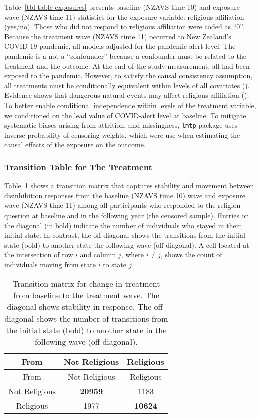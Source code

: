 \documentclass[
  singlecolumn]{article}
\begin{document}
Table~\ref{tbl-table-exposures} presents baseline (NZAVS time 10) and
exposure wave (NZAVS time 11) statistics for the exposure variable:
religious affiliation (yes/no). Those who did not respond to religious
affiliation were coded as ``0''. Because the treatment wave (NZAVS time
11) occurred to New Zealand's COVID-19 pandemic, all models adjusted for
the pandemic alert-level. The pandemic is a not a ``confounder'' because
a confounder must be related to the treatment and the outcome. At the
end of the study measurement, all had been exposed to the pandemic.
However, to satisfy the causal consistency assumption, all treatments
must be conditionally equivalent within levels of all covariates
(). Evidence
shows that dangerous natural events may affect religious affiliation
(). To better enable
conditional independence within levels of the treatment variable, we
conditioned on the lead value of COVID-alert level at baseline. To
mitigate systematic biases arising from attrition, and missingness,
\texttt{lmtp} package uses inverse probability of censoring weights,
which were use when estimating the causal effects of the exposure on the
outcome.

\subsubsection{Transition Table for The
Treatment}\label{transition-table-for-the-treatment}

Table~\ref{tbl-transition} shows a transition matrix that captures
stability and movement between disinhibition responses from the baseline
(NZAVS time 10) wave and exposure wave (NZAVS time 11) among all
participants who responded to the religion question at baseline and in
the following year (the censored sample). Entries on the diagonal (in
bold) indicate the number of individuals who stayed in their initial
state. In contrast, the off-diagonal shows the transitions from the
initial state (bold) to another state the following wave (off-diagonal).
A cell located at the intersection of row \(i\) and column \(j\), where
\(i \neq j\), shows the count of individuals moving from state \(i\) to
state \(j\).

\begin{longtable}[]{@{}ccc@{}}
\caption{Transition matrix for change in treatment from baseline to the
treatment wave. The diagonal shows stability in response. The
off-diagonal shows the number of transitions from the initial state
(bold) to another state in the following wave
(off-diagonal).}\label{tbl-transition}\tabularnewline
\toprule\noalign{}
From & Not Religious & Religious \\
\midrule\noalign{}
\endfirsthead
\toprule\noalign{}
From & Not Religious & Religious \\
\midrule\noalign{}
\endhead
\bottomrule\noalign{}
\endlastfoot
Not Religious & \textbf{20959} & 1183 \\
Religious & 1977 & \textbf{10624} \\
\end{longtable}
\end{document}
